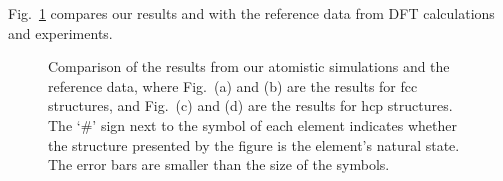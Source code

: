 \documentclass[%
 reprint,
 amsmath,amssymb,
 aps,
]{revtex4-1}
\begin{document}
Fig.~\ref{fig:compare} compares our results and with the reference data from DFT calculations and experiments.
\noindent\begin{figure}
\centering
\noindent\ignorespaces
{}
\newline
{}
\newline
{}
\newline
{}
\caption{\label{fig:compare}
 Comparison of the results from our atomistic simulations and the reference data, where Fig.~(a) and (b) are the results for fcc structures, and Fig.~(c) and (d) are the results for hcp structures.
 The `\#' sign next to the symbol of each element indicates whether the structure presented by the figure is the element's natural state.
 The error bars are smaller than the size of the symbols.
}
\end{figure}
\end{document}
